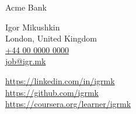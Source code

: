 \documentclass[9pt,a4paper]{juicv}
\makeatletter
\newcommand{\myphone}{\href{tel:+440000000000}{+44 00 0000 0000}}
\newcommand{\myemail}{\href{mailto:job@igr.mk}{job@igr.mk}}
\makeatother
\begin{document}
\begin{paracol}{2}
    Acme Bank

    Igor Mikushkin\\
    London, United Kingdom\\
    \myphone\\
    \myemail

    \vspace{6pt}
    {
        \small
        \href{https://linkedin.com/in/igrmk}{https://linkedin.com/in/igrmk}\\
        \href{https://github.com/igrmk}{https://github.com/igrmk}\\
        \href{https://coursera.org/learner/igrmk}{https://coursera.org/learner/igrmk}
        \par
    }

\end{paracol}
\end{document}
